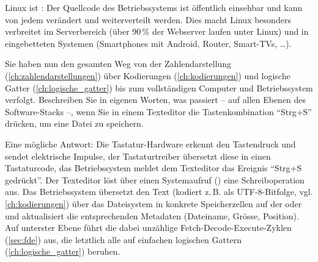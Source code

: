 \begin{myremark}
    Linux ist : Der Quellcode des Betriebssystems ist öffentlich einsehbar und kann von jedem verändert und weiterverteilt werden. Dies macht Linux besonders verbreitet im Serverbereich (über 90\,\% der Webserver laufen unter Linux) und in eingebetteten Systemen (Smartphones mit Android, Router, Smart-TVs, \ldots).
\end{myremark}

\begin{mychallenge}
    Sie haben nun den gesamten Weg von der Zahlendarstellung (\cref{ch:zahlendarstellungen}) über Kodierungen (\cref{ch:kodierungen}) und logische Gatter (\cref{ch:logische_gatter}) bis zum vollständigen Computer und Betriebssystem verfolgt. Beschreiben Sie in eigenen Worten, was passiert -- auf allen Ebenen des Software-Stacks --, wenn Sie in einem Texteditor die Tastenkombination \enquote{Strg+S} drücken, um eine Datei zu speichern.
    \begin{myanswer}
        \begin{center}
            
        \end{center}
        Eine mögliche Antwort: Die Tastatur-Hardware erkennt den Tastendruck und sendet elektrische Impulse, der Tastaturtreiber übersetzt diese in einen Tastaturcode, das Betriebssystem meldet dem Texteditor das Ereignis \enquote{Strg+S gedrückt}. Der Texteditor löst über einen Systemaufruf () eine Schreiboperation aus. Das Betriebssystem übersetzt den Text (kodiert z.\,B. als \gls{UTF-8}-Bitfolge, vgl. \cref{ch:kodierungen}) über das Dateisystem in konkrete Speicherzellen auf der  oder  und aktualisiert die entsprechenden Metadaten (Dateiname, Grösse, Position). Auf unterster Ebene führt die  dabei unzählige Fetch-Decode-Execute-Zyklen (\cref{sec:fde}) aus, die letztlich alle auf einfachen logischen Gattern (\cref{ch:logische_gatter}) beruhen.
    \end{myanswer}
\end{mychallenge}
